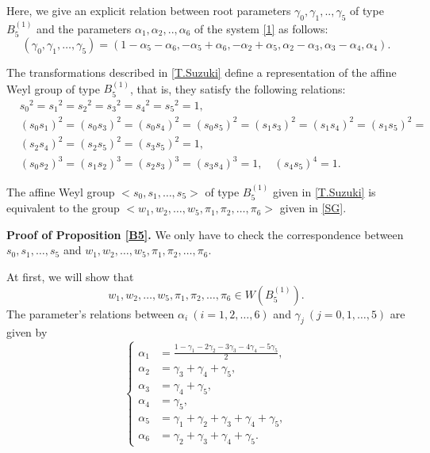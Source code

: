 Here, we give an explicit relation between root parameters $\gamma_0,\gamma_1,..,\gamma_5$ of type $B_5^{(1)}$ and the parameters $\alpha_1,\alpha_2,..,\alpha_6$ of the system \eqref{1} as follows:
\begin{equation}
(\gamma_0,\gamma_1,\dots,\gamma_5)=(1-\alpha_5-\alpha_6,-\alpha_5+\alpha_6,-\alpha_2+\alpha_5,\alpha_2-\alpha_3,\alpha_3-\alpha_4,\alpha_4).
\end{equation}

\begin{Lemma}
The transformations described in \eqref{T.Suzuki} define a representation of the affine Weyl group of type $B_5^{(1)}$, that is, they satisfy the following relations\rm{:\rm}
\begin{align*}
&{s_0}^2={s_1}^2={s_2}^2={s_3}^2={s_4}^2={s_5}^2=1,\\
&(s_0s_1)^2=(s_0s_3)^2=(s_0s_4)^2=(s_0s_5)^2=(s_1s_3)^2=(s_1s_4)^2=(s_1s_5)^2=\\
&(s_2s_4)^2=(s_2s_5)^2=(s_3s_5)^2=1,\\
&(s_0s_2)^3=(s_1s_2)^3=(s_2s_3)^3=(s_3s_4)^3=1, \quad (s_4s_5)^4=1.
\end{align*}
\end{Lemma}




\begin{prop}\label{B5}
The affine Weyl group $<s_0,s_1,\dots,s_5>$ of type $B_5^{(1)}$ given in \eqref{T.Suzuki} is equivalent to the group $<w_1,w_2,\dots,w_5,\pi_1,\pi_2,\dots,\pi_6>$ given in \eqref{SG}.
\end{prop}

{\bf Proof of Proposition \ref{B5}.}
We only have to check the correspondence between $s_0,s_1,\dots,s_5$ and $w_1,w_2,\dots,w_5,\pi_1,\pi_2,\dots,\pi_6$.

At first, we will show that
$$
w_1,w_2,\dots,w_5,\pi_1,\pi_2,\dots,\pi_6 \in W(B_5^{(1)}).
$$
The parameter's relations between $\alpha_i \ (i=1,2,\dots,6)$ and $\gamma_j \ (j=0,1,\dots,5)$ are given by
\begin{equation}
  \left\{
  \begin{aligned}
   \alpha_1 &=\frac{1-\gamma_1-2\gamma_2-3\gamma_3-4\gamma_4-5\gamma_5}{2},\\
   \alpha_2 &=\gamma_3+\gamma_4+\gamma_5,\\
   \alpha_3 &=\gamma_4+\gamma_5,\\
   \alpha_4 &=\gamma_5,\\
   \alpha_5 &=\gamma_1+\gamma_2+\gamma_3+\gamma_4+\gamma_5,\\
   \alpha_6 &=\gamma_2+\gamma_3+\gamma_4+\gamma_5.
   \end{aligned}
  \right. 
\end{equation}

